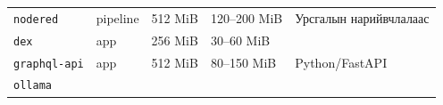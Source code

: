 \begin{longtable}[]{@{}lllll@{}}
\begin{minipage}[t]{0.17\columnwidth}
\texttt{nodered}\strut
\end{minipage} & \begin{minipage}[t]{0.17\columnwidth}\raggedright
pipeline\strut
\end{minipage} & \begin{minipage}[t]{0.17\columnwidth}\raggedright
512 MiB\strut
\end{minipage} & \begin{minipage}[t]{0.17\columnwidth}\raggedright
120--200 MiB\strut
\end{minipage} & \begin{minipage}[t]{0.17\columnwidth}\raggedright
Урсгалын нарийвчлалаас\strut
\end{minipage}\tabularnewline
\begin{minipage}[t]{0.17\columnwidth}\raggedright
\texttt{dex}\strut
\end{minipage} & \begin{minipage}[t]{0.17\columnwidth}\raggedright
app\strut
\end{minipage} & \begin{minipage}[t]{0.17\columnwidth}\raggedright
256 MiB\strut
\end{minipage} & \begin{minipage}[t]{0.17\columnwidth}\raggedright
30--60 MiB\strut
\end{minipage} & \begin{minipage}[t]{0.17\columnwidth}\raggedright
\strut
\end{minipage}\tabularnewline
\begin{minipage}[t]{0.17\columnwidth}\raggedright
\texttt{graphql-api}\strut
\end{minipage} & \begin{minipage}[t]{0.17\columnwidth}\raggedright
app\strut
\end{minipage} & \begin{minipage}[t]{0.17\columnwidth}\raggedright
512 MiB\strut
\end{minipage} & \begin{minipage}[t]{0.17\columnwidth}\raggedright
80--150 MiB\strut
\end{minipage} & \begin{minipage}[t]{0.17\columnwidth}\raggedright
Python/FastAPI\strut
\end{minipage}\tabularnewline
\begin{minipage}[t]{0.17\columnwidth}\raggedright
\texttt{ollama}\strut
\end{minipage} & \begin{minipage}[t]{0.17\columnwidth}\raggedright

\end{minipage}
\end{longtable}
